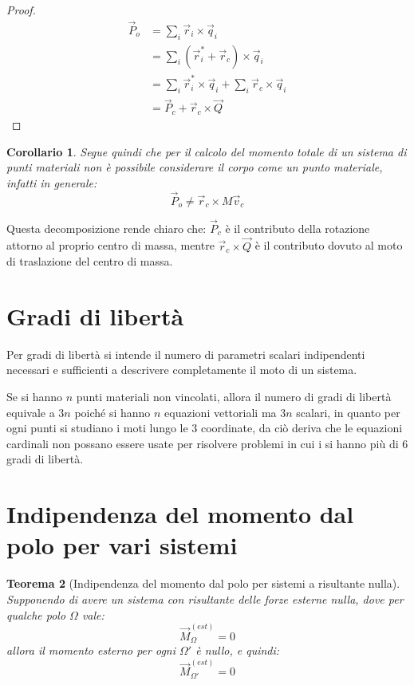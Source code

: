 \documentclass[11pt, a4paper, openright]{book}
\theoremstyle{plain}
\newtheorem{theorem}{Teorema}[section]
\newtheorem{corollario}[theorem]{Corollario}
\theoremstyle{definition}
\begin{document}
\begin{proof}
\begin{align}
    \vec{P}_o & = \sum_i \vec{r}_i \times \vec{q}_i \\
    & = \sum_i (\vec{r}_i^* + \vec{r}_c) \times \vec{q}_i \\
    & = \sum_i \vec{r}_i^* \times \vec{q}_i + \sum_i \vec{r}_c  \times \vec{q}_i \\
    & = \vec{P}_c + \vec{r}_c \times \vec{Q}
\end{align}
\end{proof}

\begin{corollario}
\label{cor:Po-non-puntiforme}
Segue quindi che per il calcolo del momento totale di un sistema di
punti materiali non è possibile considerare il corpo come un punto
materiale, infatti in generale:
\begin{equation}
    \vec{P}_o \not = \vec{r}_c \times M\vec{v}_c
\end{equation}
\end{corollario}

Questa decomposizione rende chiaro che: $\vec{P}_c$ è il contributo della rotazione attorno al proprio centro di massa, mentre $\vec{r}_c \times \vec{Q}$ è il contributo dovuto al moto di traslazione del centro di massa.

\section{Gradi di libertà}
Per gradi di libertà si intende il numero di parametri scalari indipendenti necessari e sufficienti a descrivere completamente il moto di un sistema.

Se si hanno $n$ punti materiali non vincolati, allora il numero di gradi di libertà equivale a $3n$ poiché si hanno $n$ equazioni vettoriali ma $3n$ scalari, in quanto per ogni punti si studiano i moti lungo le 3 coordinate, da ciò deriva che le equazioni cardinali non possano essere usate per risolvere problemi in cui i si hanno più di 6 gradi di libertà.

\section{Indipendenza del momento dal polo per vari sistemi} 
\begin{theorem}[Indipendenza del momento dal polo per sistemi a risultante nulla]
    Supponendo di avere un sistema con risultante delle forze esterne nulla, dove per qualche polo $\Omega$ vale:
        \begin{equation}
            \vec{M}_\Omega^{(est)} = 0
        \end{equation}
    allora il momento esterno per ogni $\Omega'$ è nullo, e quindi:
        \begin{equation}
            \vec{M}_{\Omega'}^{(est)} = 0
        \end{equation}
\end{theorem}
\end{document}
